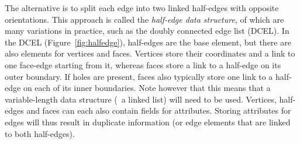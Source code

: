 The alternative is to split each edge into two linked half-edges with opposite orientations.
This approach is called the \emph{half-edge data structure}, of which are many variations in practice, such as the doubly connected edge list (DCEL).
In the DCEL (Figure~\ref{fig:halfedge}), half-edges are the base element, but there are also elements for vertices and faces.
Vertices store their coordinates and a link to one face-edge starting from it, whereas faces store a link to a half-edge on its outer boundary.
If holes are present, faces also typically store one link to a half-edge on each of its inner boundaries.
Note however that this means that a variable-length data structure (\eg\ a linked list) will need to be used.
Vertices, half-edges and faces can each also contain fields for attributes.
Storing attributes for edges will thus result in duplicate information (or edge elements that are linked to both half-edges).

